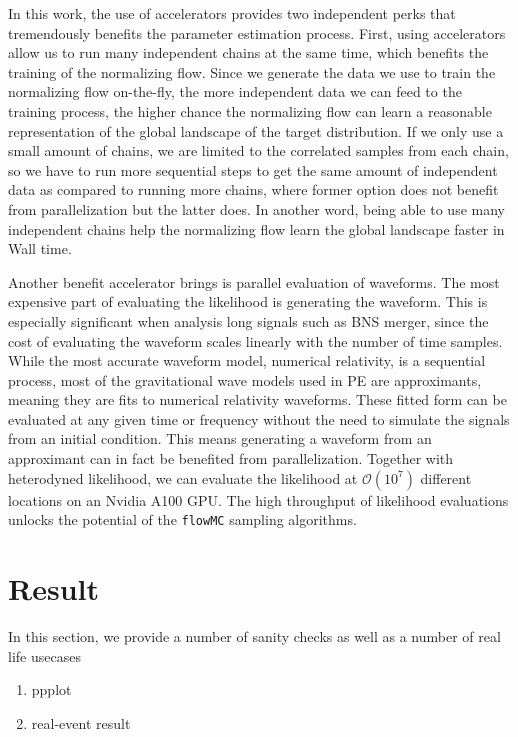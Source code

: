 \documentclass[twocolumn]{aastex631}
\begin{document}
In this work, the use of accelerators provides two independent perks that
tremendously benefits the parameter estimation process. First, using
accelerators allow us to run many independent chains at the same time, which
benefits the training of the normalizing flow. Since we generate the data we use
to train the normalizing flow on-the-fly, the more independent data we can feed
to the training process, the higher chance the normalizing flow can learn a
reasonable representation of the global landscape of the target distribution. If
we only use a small amount of chains, we are limited to the correlated samples
from each chain, so we have to run more sequential steps to get the same amount
of independent data as compared to running more chains, where former option does
not benefit from parallelization but the latter does. In another word, being
able to use many independent chains help the normalizing flow learn the global
landscape faster in Wall time.


Another benefit accelerator brings is parallel evaluation of waveforms. The most
expensive part of evaluating the likelihood is generating the waveform. This is
especially significant when analysis long signals such as BNS merger, since the
cost of evaluating the waveform scales linearly with the number of time samples.
While the most accurate waveform model, numerical relativity, is a sequential
process, most of the gravitational wave models used in PE are approximants,
meaning they are fits to numerical relativity waveforms. These fitted form can
be evaluated at any given time or frequency without the need to simulate the
signals from an initial condition. This means generating a waveform from an
approximant can in fact be benefited from parallelization. Together with
heterodyned likelihood, we can evaluate the likelihood at $\mathcal{O}(10^7)$
different locations on an Nvidia A100 GPU. The high throughput of likelihood
evaluations unlocks the potential of the \texttt{flowMC} sampling algorithms.

\section{Result}
\label{sec: Result}

In this section, we provide a number of sanity checks as well as a number of real life usecases

\begin{enumerate}
    \item ppplot
    \item real-event result
\end{enumerate}
\end{document}
